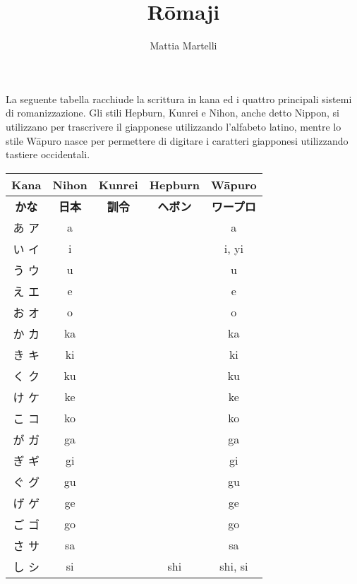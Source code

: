 \documentclass{article}
\title{R\={o}maji}
\author{Mattia Martelli}
\begin{document}
    \maketitle

    La seguente tabella racchiude la scrittura in kana ed i quattro principali sistemi di romanizzazione. Gli stili
    Hepburn, Kunrei e Nihon, anche detto Nippon, si utilizzano per trascrivere il giapponese utilizzando l'alfabeto
    latino, mentre lo stile W\={a}puro nasce per permettere di digitare i caratteri giapponesi utilizzando tastiere
    occidentali.

        \begin{center}
            \begin{japanese}
            \begin{longtable}{|c|c c c|c|}
                \hline
                \textitalian{\textbf{Kana}} & \textitalian{\textbf{Nihon}} & \textitalian{\textbf{Kunrei}} & \textitalian{\textbf{Hepburn}} & \textitalian{\textbf{Wāpuro}} \\ \hline
                \textbf{かな} & \textbf{日本} & \textbf{訓令} & \textbf{ヘボン} & \textbf{ワープロ} \\ \hline\hline
                あ ア & a &&& a \\ \hline
                い イ & i &&& i, yi \\ \hline
                う ウ & u &&& u \\ \hline
                え エ & e &&& e \\ \hline
                お オ & o &&& o \\ \hline
                か カ & ka &&& ka \\ \hline
                き キ & ki &&& ki \\ \hline
                く ク & ku &&& ku \\ \hline
                け ケ & ke &&& ke \\ \hline
                こ コ & ko &&& ko \\ \hline
                が ガ & ga &&& ga \\ \hline
                ぎ ギ & gi &&& gi \\ \hline
                ぐ グ & gu &&& gu \\ \hline
                げ ゲ & ge &&& ge \\ \hline
                ご ゴ & go &&& go \\ \hline
                さ サ & sa &&& sa \\ \hline
                し シ & si && shi & shi, si \\ \hline

\end{longtable}
\end{japanese}
\end{center}
\end{document}
